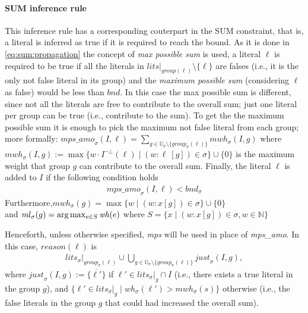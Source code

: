 \paragraph{SUM inference rule} 
This inference rule has a corresponding couterpart in the SUM constraint, that is,
a literal is inferred as true if it is required to reach the bound.
As it is done in \eqref{eq:sum:propagation} the concept of \textit{max possible sum} is used, a literal  $\ell$ is required to be true if all the literals 
in $\mathit{lits}|_{group(\ell)} \setminus \{ \ell \}$ are 
falses (i.e., it is the only not false literal in its group) and 
the \textit{maximum possible sum} (considering $\ell$ as false) would be less than $\mathit{bnd}$.
In this case the max possible sum is different, since not all the literals are free to contribute to the overall 
sum; just one literal per group can be true (i.e., contribute to the sum).
To get the the maximum possible sum it is enough to pick the maximum not false literal from each group;
more formally: $\mathit{mps\_amo}_{\sigma}(I,\ell) = \sum_{g \in \mathbb{G}_\sigma \setminus
\{\mathit{group}_\sigma(\ell)\}}{\mathit{mwh}_\sigma(I,g)}$ 
where $\mathit{mwh}_\sigma(I,g) := \max\{w \cdot I^{\neg\bot}(\ell) \mid (w : \ell\ [g]) \in \sigma\} \cup \{0\}$ 
is the maximum weight that group $g$ can contribute to the overall sum. 
Finally, the literal $\ell$ is added to $I$ if the following condition holds 
\begin{align}\label{eq:amosum:propagation:2}
    \mathit{mps\_amo}_{\sigma}(I,\ell) < \mathit{bnd}_\sigma
\end{align}
Furthermore,$\mathit{mwh}_{\sigma}(g) = 
\max\{ w \mid (w : x [g]) \in \sigma \} \cup \{0\} $\\
and $\mathit{ml}_{\sigma}(g) =  
\arg \max_{e \in S} \mathit{wh}(e)$ 
where $S = \{x \mid (w : x [g]) \in \sigma, w \in \mathbb{N}\}$ 

Henceforth, unless otherwise specified, \textit{mps} will be used in place of \textit{mps\_amo}.
In this case, $\mathit{reason}(\ell)$ is
\begin{align}\label{eq:amosum:reason:2}
\mathit{lits}_\sigma|_{\mathit{group}_\sigma(\ell)} \cup 
\bigcup_{g \in \mathbb{G}_\sigma \setminus \{\mathit{group}_\sigma(\ell)\}}{
    \mathit{just}_\sigma(I,g)
},
\end{align}
where 
$\mathit{just}_\sigma(I,g) := \{\overline{\ell'}\}$ if $\ell' \in \mathit{lits}_\sigma|_g \cap I$ 
(i.e., there exists a true literal in the group $g$), and
$\{\ell' \in \mathit{lits}_\sigma|_g \mid \mathit{wh}_\sigma(\ell') > \mathit{mwh}_\sigma(s)\}$ 
otherwise (i.e., the false literals in the group $g$ that could had increased the overall sum).


